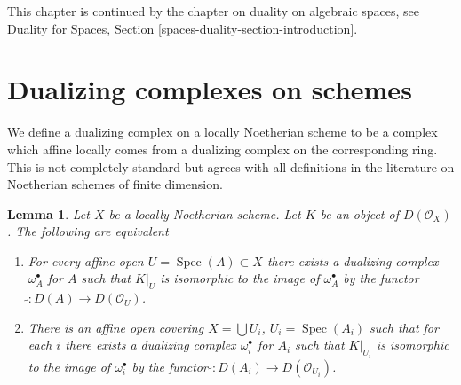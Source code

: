 \documentclass{stacks-project}
\theoremstyle{plain}
\newtheorem{lemma}[subsection]{Lemma}
\theoremstyle{definition}
\theoremstyle{remark}
\numberwithin{equation}{subsection}
\def\Spec{\mathop{\mathrm{Spec}}}
\begin{document}
\medskip\noindent
This chapter is continued by the chapter on duality
on algebraic spaces, see
Duality for Spaces, Section \ref{spaces-duality-section-introduction}.







\section{Dualizing complexes on schemes}
\label{section-dualizing-schemes}

\noindent
We define a dualizing complex on a locally Noetherian scheme
to be a complex which affine locally comes from a dualizing
complex on the corresponding ring. This is not completely
standard but agrees with all definitions in the literature
on Noetherian schemes of finite dimension.

\begin{lemma}
\label{lemma-equivalent-definitions}
Let $X$ be a locally Noetherian scheme. Let $K$ be an object of
$D(\mathcal{O}_X)$. The following are equivalent
\begin{enumerate}
\item For every affine open $U = \Spec(A) \subset X$ there exists
a dualizing complex $\omega_A^\bullet$ for $A$ such that
$K|_U$ is isomorphic to the image of $\omega_A^\bullet$ by
the functor $\widetilde{} : D(A) \to D(\mathcal{O}_U)$.
\item There is an affine open covering $X = \bigcup U_i$, $U_i = \Spec(A_i)$
such that for each $i$ there exists a dualizing complex $\omega_i^\bullet$ for
$A_i$ such that $K|_{U_i}$ is isomorphic to the image of $\omega_i^\bullet$ by
the functor $\widetilde{} : D(A_i) \to D(\mathcal{O}_{U_i})$.
\end{enumerate}
\end{lemma}
\end{document}
